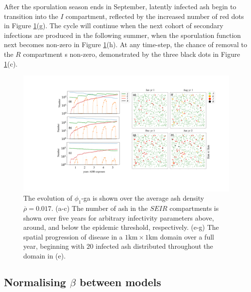After the sporulation season ends in September, latently infected ash begin to transition into the $I$ compartment, reflected by the increased number of red dots in Figure \ref{fig:SEIR-spread}(g). 
The cycle will continue when the next cohort of secondary infections are produced in the following summer, when the sporulation function next becomes non-zero in Figure \ref{fig:SEIR-spread}(h).
At any time-step, the chance of removal to the $R$ compartment s non-zero, demonstrated by the three black dots in Figure \ref{fig:SEIR-spread}(c).

\begin{landscape}
\begin{figure}
    \centering
    \includegraphics[scale=0.45]{chapter6/figures/fig4-seir.pdf} %
     \caption{The evolution of $\phi_1$-ga is shown over the average ash density $\overline{\rho} = 0.017$. (a-c) The number of ash in the $SEIR$ compartments is shown over five years for arbitrary infectivity parameters above, around, and below the epidemic threshold, respectively. (e-g) The spatial progression of disease in a $1\mathrm{km} \times 1\mathrm{km}$ domain over a full year, beginning with $20$ infected ash distributed throughout the domain in (e).}
    \label{fig:SEIR-spread}
\end{figure}
\end{landscape}

\subsection{Normalising $\beta$ between models}

